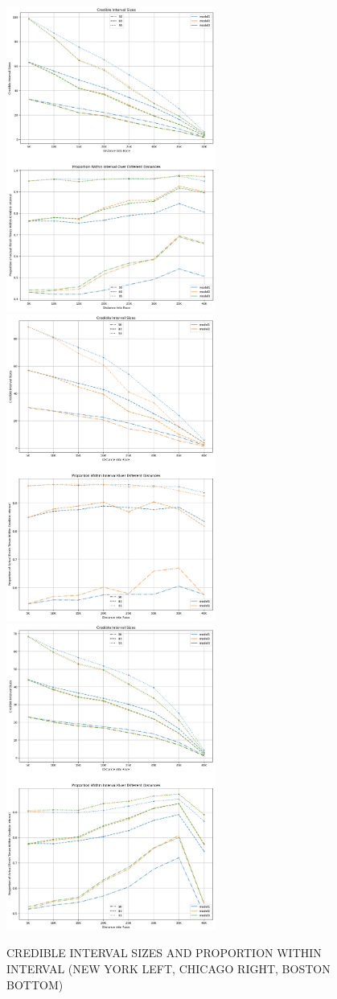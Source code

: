 \documentclass[USenglish,twocolumn]{article}
\theoremstyle{dgthm}
\theoremstyle{dgdef}
\begin{document}
\begin{figure}[ht]
    \centering
    \includegraphics[width=2.7in]{../analysis/plots/nyc_intervals.png}
    \includegraphics[width=2.7in]{../analysis/plots/chi_intervals.png}
     \includegraphics[width=2.7in]{../analysis/plots/bos_intervals.png}
    \caption{CREDIBLE INTERVAL SIZES AND PROPORTION WITHIN INTERVAL (NEW YORK LEFT, CHICAGO RIGHT, BOSTON BOTTOM)}
\end{figure}
\end{document}
